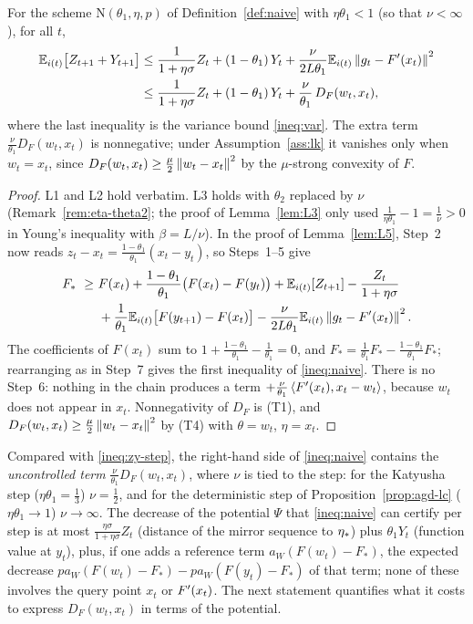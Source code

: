\begin{proposition}\label{prop:naive}
For the scheme $\mathrm N(\theta_1,\eta,p)$ of Definition~\ref{def:naive} with $\eta\theta_1<1$ (so that $\nu<\infty$), for all $t$,
\begin{equation}\label{ineq:naive}
\begin{aligned}
\mathbb{E}_{i(t)}\big[Z_{t+1}+Y_{t+1}\big]&\le\frac1{1+\eta\sigma}Z_t+(1-\theta_1)\,Y_t+\frac{\nu}{2L\theta_1}\mathbb{E}_{i(t)}\left\|g_t-F'(x_t)\right\|^2\\
&\le\frac1{1+\eta\sigma}Z_t+(1-\theta_1)\,Y_t+\frac{\nu}{\theta_1}\,D_F(w_t,x_t),
\end{aligned}
\end{equation}
where the last inequality is the variance bound \eqref{ineq:var}. The extra term $\frac\nu{\theta_1}D_F(w_t,x_t)$ is nonnegative; under Assumption~\ref{ass:lk} it vanishes only when $w_t=x_t$, since $D_F(w_t,x_t)\ge\frac\mu2\left\|w_t-x_t\right\|^2$ by the $\mu$-strong convexity of $F$.
\end{proposition}

\begin{proof}
L1 and L2 hold verbatim. L3 holds with $\theta_2$ replaced by $\nu$ (Remark~\ref{rem:eta-theta2}; the proof of Lemma~\ref{lem:L3} only used $\frac1{\eta\theta_1}-1=\frac1\nu>0$ in Young's inequality with $\beta=L/\nu$). In the proof of Lemma~\ref{lem:L5}, Step~2 now reads $z_t-x_t=\frac{1-\theta_1}{\theta_1}(x_t-y_t)$, so Steps~1--5 give
\begin{align*}
F_\ast\ \ge\ & F(x_t)+\frac{1-\theta_1}{\theta_1}\big(F(x_t)-F(y_t)\big)+\mathbb{E}_{i(t)}[Z_{t+1}]-\frac{Z_t}{1+\eta\sigma}\\
&+\frac1{\theta_1}\mathbb{E}_{i(t)}\big[F(y_{t+1})-F(x_t)\big]-\frac{\nu}{2L\theta_1}\mathbb{E}_{i(t)}\left\|g_t-F'(x_t)\right\|^2 .
\end{align*}
The coefficients of $F(x_t)$ sum to $1+\frac{1-\theta_1}{\theta_1}-\frac1{\theta_1}=0$, and $F_\ast=\frac1{\theta_1}F_\ast-\frac{1-\theta_1}{\theta_1}F_\ast$; rearranging as in Step~7 gives the first inequality of \eqref{ineq:naive}. There is no Step~6: nothing in the chain produces a term $+\frac\nu{\theta_1}\left\langle F'(x_t), x_t-w_t \right\rangle$, because $w_t$ does not appear in $x_t$. Nonnegativity of $D_F$ is (T1), and $D_F(w_t,x_t)\ge\frac\mu2\left\|w_t-x_t\right\|^2$ by (T4) with $\theta=w_t$, $\eta=x_t$.
\end{proof}

Compared with \eqref{ineq:zy-step}, the right-hand side of \eqref{ineq:naive} contains the \emph{uncontrolled term} $\frac\nu{\theta_1}D_F(w_t,x_t)$, where $\nu$ is tied to the step: for the Katyusha step ($\eta\theta_1=\frac13$) $\nu=\frac12$, and for the deterministic step of Proposition~\ref{prop:agd-lc} ($\eta\theta_1\to1$) $\nu\to\infty$. The decrease of the potential $\Psi$ that \eqref{ineq:naive} can certify per step is at most $\frac{\eta\sigma}{1+\eta\sigma}Z_t$ (distance of the mirror sequence to $\eta_\ast$) plus $\theta_1Y_t$ (function value at $y_t$), plus, if one adds a reference term $a_W(F(w_t)-F_\ast)$, the expected decrease $pa_W(F(w_t)-F_\ast)-pa_W(F(y_t)-F_\ast)$ of that term; none of these involves the query point $x_t$ or $F'(x_t)$. The next statement quantifies what it costs to express $D_F(w_t,x_t)$ in terms of the potential.

